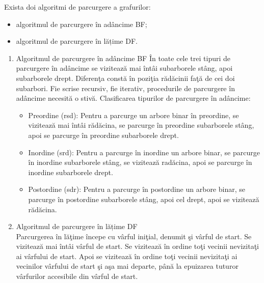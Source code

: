 \documentclass{report}
\begin{document}
Exista doi algoritmi de parcurgere  a grafurilor:
\begin{itemize}
\item algoritmul de parcurgere în adâncime BF;
\item algoritmul de parcurgere în lățime DF.
\end{itemize}
\begin{enumerate}
\item    Algoritmul de parcurgere în adâncime BF \newline
În toate cele trei tipuri de parcurgere în adâncime se vizitează mai întâi subarborele stâng, apoi subarborele drept. Diferenţa constă în poziţia rădăcinii faţă de cei doi subarbori. Fie scrise recursiv, fie iterativ, procedurile de parcurgere în adâncime necesită o stivă.
              Clasificarea tipurilor de parcurgere în adâncime:
              \begin{itemize}
             \item Preordine (rsd):
             Pentru a parcurge un arbore binar în preordine, se vizitează mai întâi rădăcina, se parcurge în preordine subarborele stâng, apoi se parcurge în preordine subarborele drept.
            \item Inordine (srd):
            Pentru a parcurge în inordine un arbore binar, se parcurge în inordine subarborele stâng, se vizitează radăcina, apoi se parcurge în inordine subarborele drept.

            \item Postordine (sdr):
            Pentru a parcurge în postordine un arbore binar, se parcurge în postordine subarborele stâng, apoi cel drept, apoi se vizitează rădăcina.

\end{itemize}
\item Algoritmul de parcurgere în lățime DF \\
 Parcurgerea în lăţime începe cu vârful iniţial, denumit şi vârful de start. Se vizitează mai întâi vârful de start. Se vizitează în ordine toţi vecinii nevizitaţi ai vârfului de start.  Apoi se vizitează în ordine toţi vecinii nevizitaţi ai vecinilor vârfului de start şi aşa mai departe, până la epuizarea tuturor vârfurilor accesibile din vârful de start.
\end{enumerate}
\end{document}
